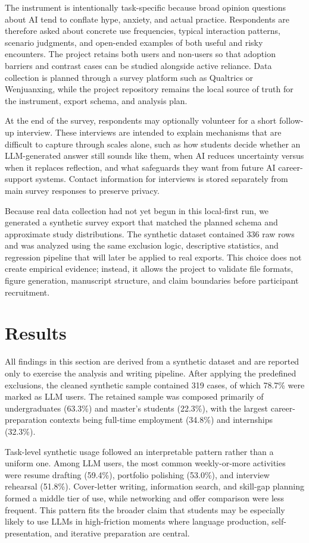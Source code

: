 \documentclass[sigconf]{acmart}
\begin{document}
The instrument is intentionally task-specific because broad opinion questions about AI tend to conflate hype, anxiety, and actual practice. Respondents are therefore asked about concrete use frequencies, typical interaction patterns, scenario judgments, and open-ended examples of both useful and risky encounters. The project retains both users and non-users so that adoption barriers and contrast cases can be studied alongside active reliance. Data collection is planned through a survey platform such as Qualtrics or Wenjuanxing, while the project repository remains the local source of truth for the instrument, export schema, and analysis plan.

At the end of the survey, respondents may optionally volunteer for a short follow-up interview. These interviews are intended to explain mechanisms that are difficult to capture through scales alone, such as how students decide whether an LLM-generated answer still sounds like them, when AI reduces uncertainty versus when it replaces reflection, and what safeguards they want from future AI career-support systems. Contact information for interviews is stored separately from main survey responses to preserve privacy.

Because real data collection had not yet begun in this local-first run, we generated a synthetic survey export that matched the planned schema and approximate study distributions. The synthetic dataset contained 336 raw rows and was analyzed using the same exclusion logic, descriptive statistics, and regression pipeline that will later be applied to real exports. This choice does not create empirical evidence; instead, it allows the project to validate file formats, figure generation, manuscript structure, and claim boundaries before participant recruitment.

\section{Results}
All findings in this section are derived from a synthetic dataset and are reported only to exercise the analysis and writing pipeline. After applying the predefined exclusions, the cleaned synthetic sample contained 319 cases, of which 78.7\% were marked as LLM users. The retained sample was composed primarily of undergraduates (63.3\%) and master's students (22.3\%), with the largest career-preparation contexts being full-time employment (34.8\%) and internships (32.3\%).

Task-level synthetic usage followed an interpretable pattern rather than a uniform one. Among LLM users, the most common weekly-or-more activities were resume drafting (59.4\%), portfolio polishing (53.0\%), and interview rehearsal (51.8\%). Cover-letter writing, information search, and skill-gap planning formed a middle tier of use, while networking and offer comparison were less frequent. This pattern fits the broader claim that students may be especially likely to use LLMs in high-friction moments where language production, self-presentation, and iterative preparation are central.
\end{document}
